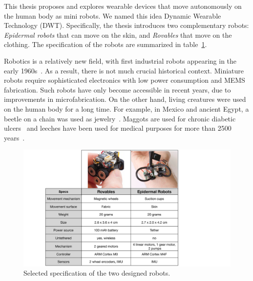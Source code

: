 This thesis proposes and explores wearable devices that move autonomously on the human body as mini robots. We named this idea Dynamic Wearable Technology (DWT).  Specifically, the thesis introduces two complementary robots: \textit{Epidermal robots} that can move on the skin, and \textit{Rovables} that move on the clothing. The specification of the robots are summarized in table~\ref{fig:Table_robots_specs}.

Robotics is a relatively new field, with first industrial robots appearing in the early 1960s~\cite{nof1999handbook}. As a result, there is not much crucial historical context. Miniature robots require sophisticated electronics with low power consumption and MEMS fabrication. Such robots have only become accessible in recent years, due to improvements in microfabrication. On the other hand, living creatures were used on the human body for a long time. For example, in Mexico and ancient Egypt, a beetle on a chain was used as jewelry~\cite{BettleJewelry}. Maggots are used for chronic diabetic ulcers~\cite{sherman2003maggot} and leeches have been used for medical purposes for more than 2500 years~\cite{singh2010medicinal}.

\begin{figure}[!ht]
\centering
\includegraphics[width=\textwidth]{pictures/chapter1/table_two_robots.pdf}
\caption{Selected specification of the two designed robots. }
\label{fig:Table_robots_specs}
\end{figure}

